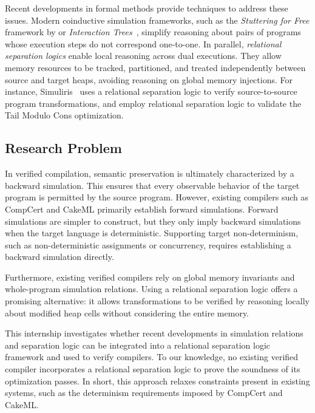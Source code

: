 \documentclass[report.tex]{subfiles}
\begin{document}
Recent developments in formal methods
provide techniques to address these issues.
Modern coinductive simulation frameworks,
such as the \emph{Stuttering for Free} framework by \textcite{cho-23-stuttering}
or \emph{Interaction Trees}~\parencite{xia-20-itrees},
simplify reasoning about pairs of programs
whose execution steps do not correspond one-to-one.
In parallel,
\emph{relational separation logics}
enable local reasoning across dual executions.
They allow memory resources to be tracked,
partitioned,
and treated independently between source and target heaps,
avoiding reasoning on global memory injections.
For instance,
Simuliris~\parencite{gaher-22-simuliris}
uses a relational separation logic
to verify source-to-source program transformations,
and \textcite{allain-25-tmc}
employ relational separation logic
to validate the Tail Modulo Cons optimization.

\subsection*{Research Problem}

In verified compilation,
semantic preservation is ultimately characterized by a backward simulation.
This ensures that every observable behavior of the target program
is permitted by the source program.
However,
existing compilers such as CompCert and CakeML
primarily establish forward simulations.
Forward simulations are simpler to construct,
but they only imply backward simulations
when the target language is deterministic.
Supporting target non-determinism,
such as non-deterministic assignments or concurrency,
requires establishing a backward simulation directly.

Furthermore,
existing verified compilers rely on global memory invariants
and whole-program simulation relations.
Using a relational separation logic offers a promising alternative:
it allows transformations to be verified by reasoning locally
about modified heap cells without considering the entire memory.

This internship investigates whether recent developments
in simulation relations and separation logic
can be integrated into a relational separation logic framework
and used to verify compilers.
To our knowledge,
no existing verified compiler incorporates a relational separation logic
to prove the soundness of its optimization passes.
In short,
this approach relaxes constraints present in existing systems,
such as the determinism requirements imposed by CompCert and CakeML.
\end{document}
